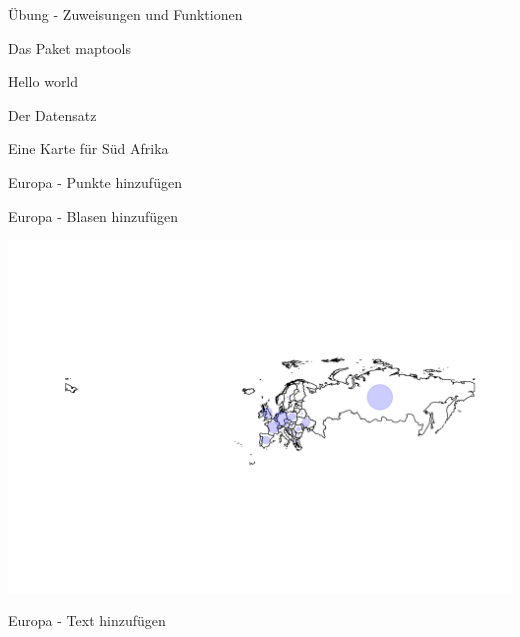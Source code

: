 \documentclass[ignorenonframetext,]{beamer}
\newenvironment{Shaded}{\begin{snugshade}}{\end{snugshade}}
\newcommand{\DataTypeTok}[1]{\textcolor[rgb]{0.74,0.68,0.62}{\underline{#1}}}
\newcommand{\DecValTok}[1]{\textcolor[rgb]{0.27,0.67,0.26}{#1}}
\newcommand{\KeywordTok}[1]{\textcolor[rgb]{0.26,0.66,0.93}{\textbf{#1}}}
\newcommand{\NormalTok}[1]{\textcolor[rgb]{0.74,0.68,0.62}{#1}}
\newcommand{\OperatorTok}[1]{\textcolor[rgb]{0.74,0.68,0.62}{#1}}
\newcommand{\StringTok}[1]{\textcolor[rgb]{0.02,0.61,0.04}{#1}}
\begin{document}
\begin{frame}[fragile]{Übung - Zuweisungen und Funktionen}
\begin{frame}[fragile]{Das Paket maptools}
\begin{frame}[fragile]{Hello world}
\begin{frame}[fragile]{Der Datensatz}
\begin{frame}[fragile]{Eine Karte für Süd Afrika}
\begin{frame}[fragile]{Europa - Punkte hinzufügen}
\end{frame}

\begin{frame}[fragile]{Europa - Blasen hinzufügen}
\protect\hypertarget{europa---blasen-hinzufugen}{}

\begin{Shaded}
\end{Shaded}

\includegraphics{Geomedizin_files/figure-beamer/unnamed-chunk-85-1.pdf}

\end{frame}

\begin{frame}[fragile]{Europa - Text hinzufügen}
\protect\hypertarget{europa---text-hinzufugen}{}

\begin{Shaded}
\end{Shaded}


\end{frame}
\end{frame}
\end{frame}
\end{frame}
\end{frame}
\end{frame}
\end{document}
